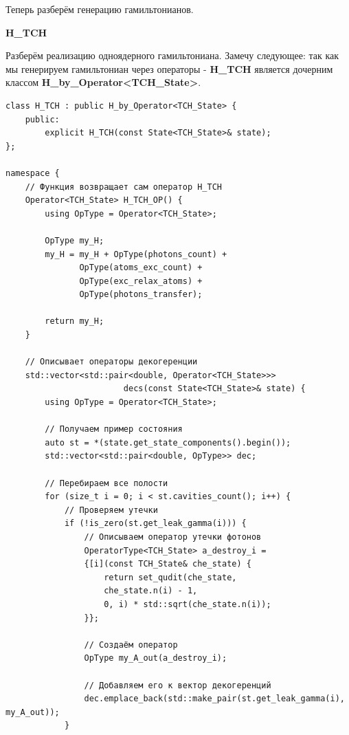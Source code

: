 \documentclass[12pt,fleqn]{article}
\begin{document}
    Теперь разберём генерацию гамильтонианов.

    \begin{center}
        \textbf{H\_TCH}
    \end{center}

    Разберём реализацию одноядерного гамильтониана. Замечу следующее: так как мы генерируем гамильтониан через операторы - \textbf{H\_TCH}
     является дочерним классом \newline \textbf{H\_by\_Operator<TCH\_State>}.
\begin{mdframed}[linecolor=black, topline=true, bottomline=true,
leftline=false, rightline=false]
\begin{verbatim}
class H_TCH : public H_by_Operator<TCH_State> {
    public:
        explicit H_TCH(const State<TCH_State>& state);
};

namespace {
    // Функция возвращает сам оператор H_TCH
    Operator<TCH_State> H_TCH_OP() {
        using OpType = Operator<TCH_State>;

        OpType my_H;
        my_H = my_H + OpType(photons_count) + 
               OpType(atoms_exc_count) + 
               OpType(exc_relax_atoms) + 
               OpType(photons_transfer);

        return my_H;
    }
    
    // Описывает операторы декогеренции
    std::vector<std::pair<double, Operator<TCH_State>>> 
                        decs(const State<TCH_State>& state) {
        using OpType = Operator<TCH_State>;

        // Получаем пример состояния
        auto st = *(state.get_state_components().begin());
        std::vector<std::pair<double, OpType>> dec;

        // Перебираем все полости
        for (size_t i = 0; i < st.cavities_count(); i++) {
            // Проверяем утечки
            if (!is_zero(st.get_leak_gamma(i))) {
                // Описываем оператор утечки фотонов
                OperatorType<TCH_State> a_destroy_i = 
                {[i](const TCH_State& che_state) {
                    return set_qudit(che_state,
                    che_state.n(i) - 1,
                    0, i) * std::sqrt(che_state.n(i));
                }};

                // Создаём оператор
                OpType my_A_out(a_destroy_i);

                // Добавляем его к вектор декогеренций
                dec.emplace_back(std::make_pair(st.get_leak_gamma(i), my_A_out));
            }


\end{verbatim}
\end{mdframed}
\end{document}
